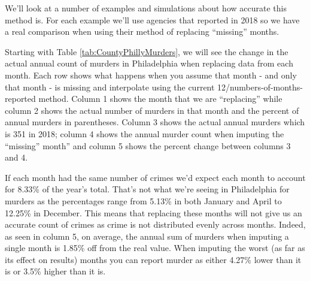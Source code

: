 \documentclass[
]{krantz}
\begin{document}
We'll look at a number of examples and simulations about how
accurate this method is. For each example we'll use agencies
that reported in 2018 so we have a real comparison when
using their method of replacing ``missing'' months.

Starting with Table \ref{tab:CountyPhillyMurders}, we will
see the change in the actual annual count of murders in
Philadelphia when replacing data from each month. Each row
shows what happens when you assume that month - and only
that month - is missing and interpolate using the current
12/numbers-of-months-reported method. Column 1 shows the
month that we are ``replacing'' while column 2 shows the
actual number of murders in that month and the percent of
annual murders in parentheses. Column 3 shows the actual
annual murders which is 351 in 2018; column 4 shows the
annual murder count when imputing the ``missing'' month''
and column 5 shows the percent change between columns 3 and
4.

If each month had the same number of crimes we'd expect each
month to account for 8.33\% of the year's total. That's not
what we're seeing in Philadelphia for murders as the
percentages range from 5.13\% in both January and April to
12.25\% in December. This means that replacing these months
will not give us an accurate count of crimes as crime is not
distributed evenly across months. Indeed, as seen in column
5, on average, the annual sum of murders when imputing a
single month is 1.85\% off from the real value. When
imputing the worst (as far as its effect on results) months
you can report murder as either 4.27\% lower than it is or
3.5\% higher than it is.
\end{document}
